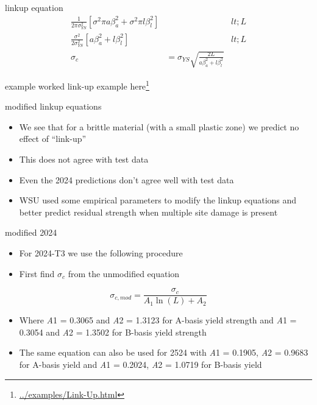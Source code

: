 \documentclass[
  letterpaper,
  ignorenonframetext,
  aspectratio=43,
  handout,
  12pt]{beamer}
\DeclareRobustCommand{\href}[2]{#2\footnote{\url{#1}}}
\providecommand{\tightlist}{%
  \setlength{\itemsep}{0pt}\setlength{\parskip}{0pt}}
\providecommand{\tightlist}{%
\setlength{\itemsep}{0pt}\setlength{\parskip}{0pt}}
\begin{document}
\begin{frame}{linkup equation}
\protect\hypertarget{linkup-equation-2}{}
\[\begin{aligned}
  \frac{1}{2\pi\sigma_{YS}^2} \left[\sigma^2 \pi a \beta_a^2 + \sigma^2 \pi l \beta_l^2\right] &&lt; L \\
  \frac{\sigma^2}{2\sigma_{YS}^2} \left[a \beta_a^2 + l \beta_l^2\right] &&lt; L \\
          \sigma_c &= \sigma_{YS}\sqrt{\frac{2L}{a \beta_a^2 + l \beta_l^2}}
\end{aligned}\]
\end{frame}

\begin{frame}{example}
\protect\hypertarget{example}{}
worked link-up example \href{../examples/Link-Up.html}{here}
\end{frame}

\begin{frame}{modified linkup equations}
\protect\hypertarget{modified-linkup-equations}{}
\begin{itemize}
\tightlist
\item
  We see that for a brittle material (with a small plastic zone) we
  predict no effect of ``link-up''
\item
  This does not agree with test data
\item
  Even the 2024 predictions don't agree well with test data
\item
  WSU used some empirical parameters to modify the linkup equations and
  better predict residual strength when multiple site damage is present
\end{itemize}
\end{frame}

\begin{frame}{modified 2024}
\protect\hypertarget{modified-2024}{}
\begin{itemize}
\tightlist
\item
  For 2024-T3 we use the following procedure
\item
  First find \(\sigma_c\) from the unmodified equation
\end{itemize}

\[\sigma_{c,mod} = \frac{\sigma_c}{A_1 \ln (L) + A_2}\]

\begin{itemize}
\tightlist
\item
  Where \emph{A}1 = 0.3065 and \emph{A}2 = 1.3123 for A-basis yield
  strength and \emph{A}1 = 0.3054 and \emph{A}2 = 1.3502 for B-basis
  yield strength
\item
  The same equation can also be used for 2524 with \emph{A}1 = 0.1905,
  \emph{A}2 = 0.9683 for A-basis yield and \emph{A}1 = 0.2024, \emph{A}2
  = 1.0719 for B-basis yield
\end{itemize}
\end{frame}
\end{document}
